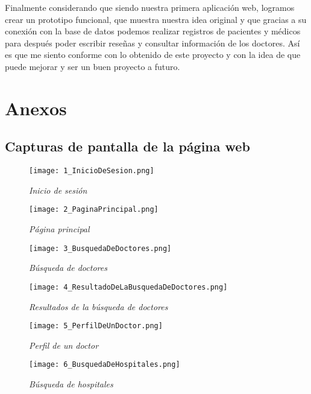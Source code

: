 \vspace{0.3 cm}

Finalmente considerando que siendo nuestra primera aplicación web, logramos crear un prototipo funcional, que muestra nuestra idea original y que gracias a su conexión con la base de datos podemos realizar registros de pacientes y médicos para después poder escribir reseñas y consultar información de los doctores. Así es que me siento conforme con lo obtenido de este proyecto y con la idea de que puede mejorar y ser un buen proyecto a futuro.

\section{Anexos}

\subsection{Capturas de pantalla de la página web}

\begin{figure}[H]
\centering
\texttt{[image: 1\_InicioDeSesion.png]}
\caption{\textit{Inicio de sesión}}
\end{figure}

\begin{figure}[H]
\centering
\texttt{[image: 2\_PaginaPrincipal.png]}
\caption{\textit{Página principal}}
\end{figure}

\begin{figure}[H]
\centering
\texttt{[image: 3\_BusquedaDeDoctores.png]}
\caption{\textit{Búsqueda de doctores}}
\end{figure}

\begin{figure}[H]
\centering
\texttt{[image: 4\_ResultadoDeLaBusquedaDeDoctores.png]}
\caption{\textit{Resultados de la búsqueda de doctores}}
\end{figure}

\begin{figure}[H]
\centering
\texttt{[image: 5\_PerfilDeUnDoctor.png]}
\caption{\textit{Perfil de un doctor}}
\end{figure}

\begin{figure}[H]
\centering
\texttt{[image: 6\_BusquedaDeHospitales.png]}
\caption{\textit{Búsqueda de hospitales}}
\end{figure}

